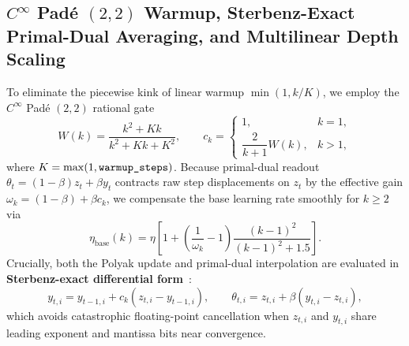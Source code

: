 \documentclass[10pt,twocolumn,letterpaper]{article}
\theoremstyle{definition}
\theoremstyle{remark}
\begin{document}
\subsection{$C^\infty$ Pad\'e $(2,2)$ Warmup, Sterbenz-Exact Primal-Dual Averaging, and Multilinear Depth Scaling}

To eliminate the piecewise kink of linear warmup $\min(1, k/K)$, we employ the $C^\infty$ Pad\'e $(2,2)$ rational gate
\begin{equation}
  W(k) = \frac{k^2 + K k}{k^2 + K k + K^2}, \qquad c_k = \begin{cases} 1, & k = 1, \\ \dfrac{2}{k+1}W(k), & k > 1, \end{cases}
  \label{eq:pade_warmup}
\end{equation}
where $K = \max(1, \text{\texttt{warmup\_steps}})$. Because primal-dual readout $\theta_t = (1-\beta)z_t + \beta y_t$ contracts raw step displacements on $z_t$ by the effective gain $\omega_k = (1-\beta) + \beta c_k$, we compensate the base learning rate smoothly for $k \ge 2$ via
\begin{equation}
  \eta_{\mathrm{base}}(k) = \eta \left[1 + \left(\frac{1}{\omega_k} - 1\right)\frac{(k-1)^2}{(k-1)^2 + 1.5}\right].
  \label{eq:omega_boost}
\end{equation}
Crucially, both the Polyak update and primal-dual interpolation are evaluated in \textbf{Sterbenz-exact differential form}~\cite{sterbenz1974floating}:
\begin{equation}
  y_{t,i} = y_{t-1,i} + c_k\left(z_{t,i} - y_{t-1,i}\right), \qquad \theta_{t,i} = z_{t,i} + \beta\left(y_{t,i} - z_{t,i}\right),
  \label{eq:sterbenz_exact}
\end{equation}
which avoids catastrophic floating-point cancellation when $z_{t,i}$ and $y_{t,i}$ share leading exponent and mantissa bits near convergence.
\end{document}
